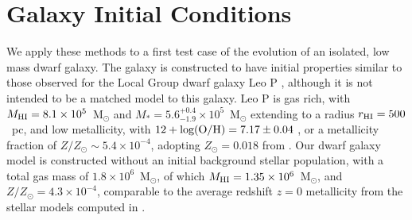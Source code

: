 \documentclass[twocolumn]{aastex61}
\begin{document}

\section{Galaxy Initial Conditions}
\label{sec:IC}
We apply these methods to a first test case of the evolution of an isolated, low mass dwarf galaxy. The galaxy is constructed to have initial properties similar to those observed for the Local Group dwarf galaxy Leo P \citep{Giovanelli2013,McQuinn2013,McQuinn2015a,McQuinn2015}, although it is not intended to be a matched model to this galaxy. Leo P is gas rich, with $M_{\rm HI} = 8.1\times 10^{5}$~M$_{\odot}$ and $M_{*} = 5.6^{+0.4}_{-1.9} \times 10^{5}$~M$_{\odot}$ \citep{McQuinn2015a} extending to a radius $r_{\rm HI} = 500$~pc, and low metallicity,
with $12 + \rm{log(O/H)} = 7.17 \pm 0.04$ \citep{Skillman2013}, or a metallicity fraction of $Z/Z_{\odot} \sim 5.4\times10^{-4}$, adopting $Z_{\odot} = 0.018$ from \citet{Asplund2009}. Our dwarf galaxy model is constructed without an initial background stellar population, with a total gas mass of $1.8 \times 10^{6}$~M$_{\odot}$, of which $M_{\rm HI} = 1.35 \times 10^{6}$~M$_{\odot}$, and $Z/Z_{\odot} = 4.3\times 10^{-4}$, comparable to the average redshift $z = 0$ metallicity from the stellar models computed in \citet{McQuinn2015}.
\end{document}
